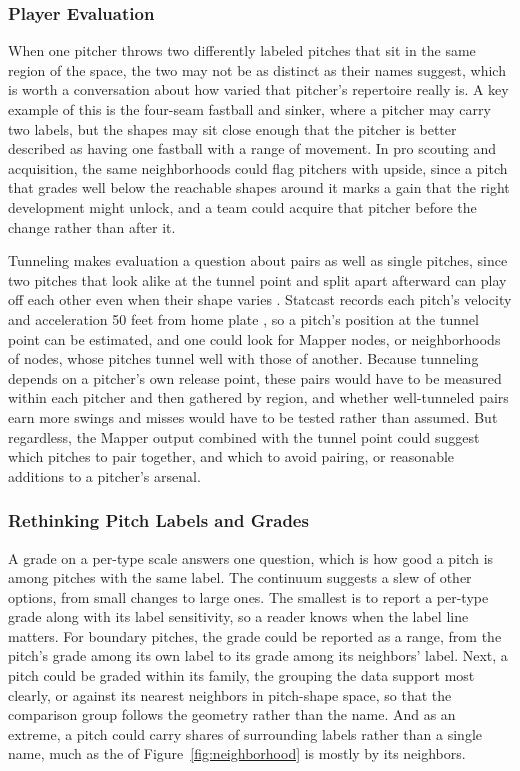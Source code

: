 \documentclass[11pt]{article}
\theoremstyle{definition}
\theoremstyle{remark}
\begin{document}
\subsubsection{Player Evaluation}
When one pitcher throws two differently labeled pitches that sit in the same region of the space, the two may not be as distinct as their names suggest, which is worth a conversation about how varied that pitcher's repertoire really is.
A key example of this is the four-seam fastball and sinker, where a pitcher may carry two labels, but the shapes may sit close enough that the pitcher is better described as having one fastball with a range of movement.
In pro scouting and acquisition, the same neighborhoods could flag pitchers with upside, since a pitch that grades well below the reachable shapes around it marks a gain that the right development might unlock, and a team could acquire that pitcher before the change rather than after it.

Tunneling makes evaluation a question about pairs as well as single pitches, since two pitches that look alike at the tunnel point and split apart afterward can play off each other even when their shape varies \parencite{sayre2017tunnels}.
Statcast records each pitch's velocity and acceleration 50 feet from home plate \parencite{savantcsvdocs}, so a pitch's position at the tunnel point can be estimated, and one could look for Mapper nodes, or neighborhoods of nodes, whose pitches tunnel well with those of another.
Because tunneling depends on a pitcher's own release point, these pairs would have to be measured within each pitcher and then gathered by region, and whether well-tunneled pairs earn more swings and misses would have to be tested rather than assumed.
But regardless, the Mapper output combined with the tunnel point could suggest which pitches to pair together, and which to avoid pairing, or reasonable additions to a pitcher's arsenal.

\subsubsection{Rethinking Pitch Labels and Grades}
A grade on a per-type scale answers one question, which is how good a pitch is among pitches with the same label.
The continuum suggests a slew of other options, from small changes to large ones.
The smallest is to report a per-type grade along with its label sensitivity, so a reader knows when the label line matters. For boundary pitches, the grade could be reported as a range, from the pitch's grade among its own label to its grade among its neighbors' label.
Next, a pitch could be graded within its family, the grouping the data support most clearly, or against its nearest neighbors in pitch-shape space, so that the comparison group follows the geometry rather than the name.
And as an extreme, a pitch could carry shares of surrounding labels rather than a single name, much as the \ExOwnName{} of Figure~\ref{fig:neighborhood} is mostly \ExAltName{} by its neighbors.
\end{document}
